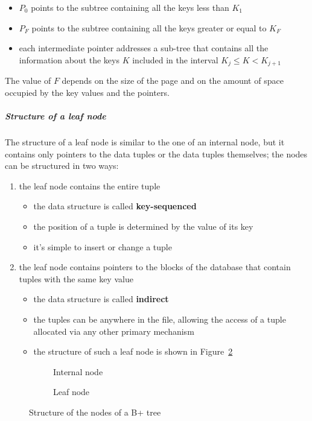 \documentclass[english]{article}
\begin{document}
\begin{itemize}
  \item \(P_0\) points to the subtree containing all the keys less than \(K_1\)
  \item \(P_F\) points to the subtree containing all the keys greater or equal to \(K_F\)
  \item each intermediate pointer addresses a sub-tree that contains all the information about the keys \(K\) included in the interval \(K_j \leq K < K_{j + 1}\)
\end{itemize}

The value of \(F\) depends on the size of the page and on the amount of space occupied by the key values and the pointers.

\subparagraph*{Structure of a leaf node}
The structure of a leaf node is similar to the one of an internal node, but it contains only pointers to the data tuples or the data tuples themselves;
the nodes can be structured in two ways:

\begin{enumerate}
  \item the leaf node contains the entire tuple
        \begin{itemize}
          \item the data structure is called \textbf{key-sequenced}
          \item the position of a tuple is determined by the value of its key
          \item it's simple to insert or change a tuple
        \end{itemize}
  \item the leaf node contains pointers to the blocks of the database that contain tuples with the same key value
        \begin{itemize}
          \item the data structure is called \textbf{indirect}
          \item the tuples can be anywhere in the file, allowing the access of a tuple allocated via any other primary mechanism
          \item the structure of such a leaf node is shown in Figure~\ref{subfig:b-tree-leaf-node}
        \end{itemize}
\end{enumerate}

\begin{figure}[htbp]
  \centering
  \bigskip
  \begin{subfigure}{0.99\textwidth}
    \centering
    \bigskip
    \caption{Internal node}
    \label{subfig:b-tree-internal-node}
    \bigskip
  \end{subfigure}
  \bigskip
  \begin{subfigure}{0.99\textwidth}
    \centering
    \bigskip
    \caption{Leaf node}
    \label{subfig:b-tree-leaf-node}
    \bigskip
  \end{subfigure}
  \caption{Structure of the nodes of a B+ tree}
  \label{fig:b-tree-structure}
\end{figure}
\end{document}
